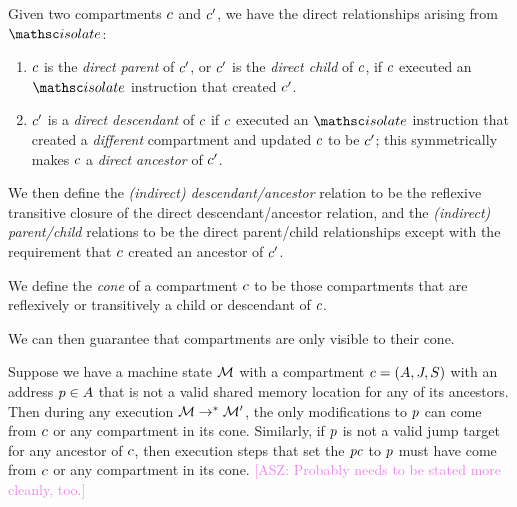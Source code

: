 \documentclass[12pt]{amsart}
\newif\ifdraft\drafttrue
\newcommand{\asz}[1]{\ifdraft\textcolor{violet}{[ASZ: #1]}\fi}
\newcommand*{\term}[1]{\emph{#1}}
\begin{document}
\begin{definition}
\label{def:inter-compartment-relations}
  Given two compartments $c$ and $c'$, we have the direct
  relationships arising from $\opcode{isolate}$:
  \begin{enumerate}
  \item $c$ is the \term{direct parent} of $c'$, or
    $c'$ is the \term{direct child} of $c$, if
    $c$ executed an $\opcode{isolate}$ instruction that created
    $c'$.
    
  \item $c'$ is a \term{direct descendant} of $c$ if
    $c$ executed an $\opcode{isolate}$ instruction that created a
    \emph{different} compartment and updated $c$ to be
    $c'$; this symmetrically makes $c$ a \term{direct
    ancestor} of $c'$.
  \end{enumerate}

  We then define the \term{(indirect) descendant/ancestor} relation to be the
  reflexive transitive closure of the direct descendant/ancestor relation, and
  the \term{(indirect) parent/child} relations to be the direct parent/child
  relationships except with the requirement that $c$ created an
  ancestor of $c'$.

  We define the \term{cone} of a compartment $c$ to be those
  compartments that are reflexively or transitively a child or descendant of
  $c$.
\end{definition}

We can then guarantee that compartments are only visible to their cone.

\begin{lemma}[In-cone changes\asz{needs a better name}]\label{lem:in-cone-changes}
  Suppose we have a machine state $\mathcal{M}$ with a compartment $c =
  (A, J, S)$ with an address $p \in
  A$ that is not a valid shared memory location for any of its
  ancestors.  Then during any execution $\mathcal{M} \to^* \mathcal{M}'$, the
  only modifications to $p$ can come from $c$ or any
  compartment in its cone.  Similarly, if $p$ is not a valid jump target
  for any ancestor of $c$, then execution steps that set the $\mathit{pc}$ to
  $p$ must have come from $c$ or any compartment in its cone.%
  \asz{Probably needs to be stated more cleanly, too.}
\end{lemma}
\end{document}
